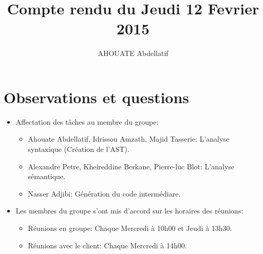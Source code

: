 \documentclass{../../../../../res/rapport}
\author{AHOUATE Abdellatif}
\title{Compte rendu du Jeudi 12 Fevrier 2015}
\begin{document}
    \maketitle
    \tableofcontents
    \clearpage
    
    \section{Observations et questions} 
    \label{sec:observations_et_questions}
    \begin{itemize}
		\item Affectation des tâches au membre du groupe:
            \begin{itemize}
				\item Ahouate Abdellatif, Idrissou Amzath, Majid Tasserie: L'analyse syntaxique (Création de l'AST). 
				\item Alexandre Petre, Kheireddine Berkane, Pierre-luc Blot: L'analyse sémantique. 
            	\item Nasser Adjibi: Génération du code intermédiare.
			\end{itemize}
		\item Les membres du groupe s'ont mis d'accord sur les horaires des réunions:
			\begin{itemize}
				\item Réunions en groupe: Chaque Mercredi à 10h00 et Jeudi à 13h30.
				\item Réunions avec le client: Chaque Mercredi à 14h00.
			\end{itemize}
	\end{itemize} 		
\end{document}
